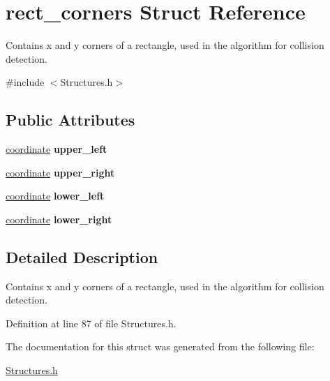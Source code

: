 \hypertarget{structrect__corners}{\section{rect\+\_\+corners Struct Reference}
\label{structrect__corners}
}


Contains x and y corners of a rectangle, used in the algorithm for collision detection.  




{\ttfamily \#include $<$Structures.\+h$>$}

\subsection*{Public Attributes}
\begin{DoxyCompactItemize}
\item 
\hypertarget{structrect__corners_a48cd191550e65bd24a7d8018c7eefd53}{\hyperlink{structcoordinate}{coordinate} {\bfseries upper\+\_\+left}}\label{structrect__corners_a48cd191550e65bd24a7d8018c7eefd53}

\item 
\hypertarget{structrect__corners_a631310450f151fd6c92132d5d7216259}{\hyperlink{structcoordinate}{coordinate} {\bfseries upper\+\_\+right}}\label{structrect__corners_a631310450f151fd6c92132d5d7216259}

\item 
\hypertarget{structrect__corners_a2960e4888d6a9621429044e426950bc8}{\hyperlink{structcoordinate}{coordinate} {\bfseries lower\+\_\+left}}\label{structrect__corners_a2960e4888d6a9621429044e426950bc8}

\item 
\hypertarget{structrect__corners_aa499428b9c692d61e1b43d059156a5af}{\hyperlink{structcoordinate}{coordinate} {\bfseries lower\+\_\+right}}\label{structrect__corners_aa499428b9c692d61e1b43d059156a5af}

\end{DoxyCompactItemize}


\subsection{Detailed Description}
Contains x and y corners of a rectangle, used in the algorithm for collision detection. 

Definition at line 87 of file Structures.\+h.



The documentation for this struct was generated from the following file\+:\begin{DoxyCompactItemize}
\item 
\hyperlink{_structures_8h}{Structures.\+h}\end{DoxyCompactItemize}
